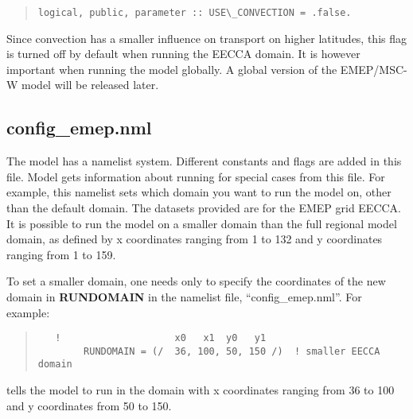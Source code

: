\begin{small}
\begin{quote}
  \begin{verbatim}
logical, public, parameter :: USE\_CONVECTION = .false. 
  \end{verbatim}
\end{quote}
\end{small}

Since convection has a smaller influence on transport on higher latitudes, 
this flag is turned off by default when running the EECCA domain. It is 
however important when running the model globally. A global version 
of the EMEP/MSC-W model will be released later. 


\subsection{config\_emep.nml}

The model has a namelist system.  Different constants and flags are added in 
this file.  Model gets information about running for special cases from this 
file.   For example, this namelist sets which domain you want to run the model 
on, other than the default domain. 
The datasets provided are for the EMEP grid EECCA. 
It is possible to run the model on a smaller domain than the full
regional model domain, as defined by  x coordinates ranging
from 1 to 132 and y coordinates ranging from 1 to 159. 

To set a smaller domain, one needs only to specify the
coordinates of the new domain in {\bf RUNDOMAIN} in the namelist file,  
 ``config\_emep.nml''. For example:

\begin{quote}
\begin{verbatim}
   !                    x0   x1  y0   y1
        RUNDOMAIN = (/  36, 100, 50, 150 /)  ! smaller EECCA domain
\end{verbatim}
\end{quote}

tells the model to run in the domain with x coordinates ranging from
36 to 100 and y coordinates from 50 to 150.\\ 


